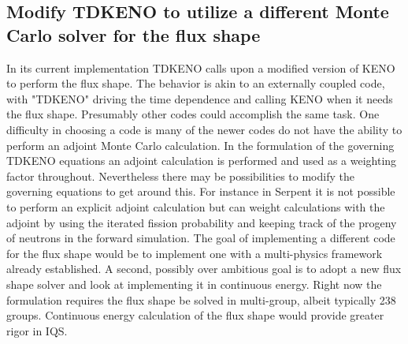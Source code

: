 \documentclass[11pt]{article}
\begin{document}
\subsection{Modify TDKENO to utilize a different Monte Carlo solver for the flux shape}
	In its current implementation TDKENO  calls upon a modified version of KENO to perform the flux shape.  The behavior is akin to an externally coupled code, with "TDKENO" driving the time dependence and calling KENO when it needs the flux shape. Presumably other codes could accomplish the same task.  One difficulty in choosing a code is many of the newer codes do not have the ability to perform an adjoint Monte Carlo calculation. In the  formulation of the governing TDKENO equations an adjoint calculation is performed and used as a weighting factor throughout.  Nevertheless there may be possibilities to modify the governing equations to get around this. For instance in Serpent it is not possible to perform an explicit adjoint calculation but can weight calculations with the adjoint by using the iterated fission probability and keeping track of the progeny of neutrons in the forward simulation.  The goal of implementing a different code for the flux shape would be to implement one with a multi-physics framework already established.  A second, possibly over ambitious goal is to adopt a new flux shape solver and look at implementing it in continuous energy.  Right now the formulation requires the flux shape be solved in multi-group, albeit typically 238 groups.  Continuous energy calculation of the flux shape would provide greater rigor in IQS.  
	
\end{document}
